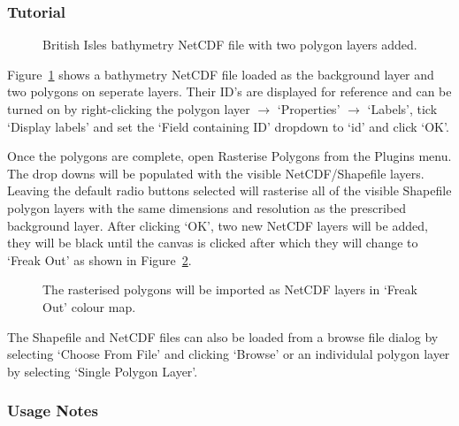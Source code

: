 \subsubsection{Tutorial}
\label{sec:rp_tutorial}
\begin{figure}[h!]
  \centering
  \caption{British Isles bathymetry NetCDF file with two polygon layers added.}
  \label{fig:rp_turorialStart}
\end{figure}

Figure~\ref{fig:rp_turorialStart} shows a bathymetry NetCDF file loaded as the background layer and two polygons on seperate layers. Their ID's are displayed for reference and can be turned on by right-clicking the polygon layer $\rightarrow$ `Properties' $\rightarrow$ `Labels', tick `Display labels' and set the `Field containing ID' dropdown to `id' and click `OK'.

Once the polygons are complete, open Rasterise Polygons from the Plugins menu. The drop downs will be populated with the visible NetCDF/Shapefile layers. Leaving the default radio buttons selected will rasterise all of the visible Shapefile polygon layers with the same dimensions and resolution as the prescribed background layer. After clicking `OK', two new NetCDF layers will be added, they will be black until the canvas is clicked after which they will change to `Freak Out' as shown in Figure~\ref{fig:rp_layersAdded}.

\begin{figure}[h!]
  \centering
  \caption{The rasterised polygons will be imported as NetCDF layers in `Freak Out' colour map.}
  \label{fig:rp_layersAdded}
\end{figure}

The Shapefile and NetCDF files can also be loaded from a browse file dialog by selecting `Choose From File' and clicking `Browse' or an individulal polygon layer by selecting `Single Polygon Layer'.

\subsubsection{Usage Notes}
\label{sec:rp_usage}

